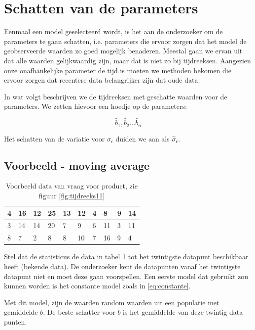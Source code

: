 \section{Schatten van de parameters}
Eenmaal een model geselecteerd wordt, is het aan de onderzoeker om de parameters te gaan schatten, i.e. parameters die ervoor zorgen dat het model de geobserveerde waarden zo goed mogelijk benaderen. Meestal gaan we ervan uit dat alle waarden gelijkwaardig zijn, maar dat is niet zo bij tijdreeksen. Aangezien onze onafhankelijke parameter de tijd is moeten we methoden bekomen die ervoor zorgen dat recentere data belangrijker zijn dat oude data. 

In wat volgt beschrijven we de tijdreeksen met geschatte waarden voor de parameters. We zetten hievoor een hoedje op de parameters:

\[ \widehat{b}_{1}, \widehat{b}_{2} \dots \widehat{b}_{n} \] 

Het schatten van de variatie voor $\sigma_{\epsilon}$ duiden we aan als $\widehat{\sigma}_{\epsilon}$.

\subsection{Voorbeeld - moving average}

\begin{table}[t]
\centering
    \begin{tabular}{|l|l|l|l|l|l|l|l|l|l|}
    \hline
    4 & 16 & 12 & 25 & 13 & 12 & 4 & 8  & 9 & 14 \\ \hline
    3 & 14 & 14 & 20 & 7  & 9  & 6 & 11 & 3 & 11 \\ \hline
    8 & 7  & 2  & 8  & 8  & 10 & 7 & 16 & 9 & 4  \\ \hline
    \end{tabular}
    \caption{Voorbeeld data van vraag voor product, zie figuur \ref{fig:tijdreeks11}}
    \label{tab:data}
\end{table}

Stel dat de statisticus de data in tabel \ref{tab:data} tot het twintigste datapunt beschikbaar heeft (bekende data). De onderzoeker kent de datapunten vanaf het twintigste datapunt niet en moet deze gaan voorspellen. Een eerste model dat gebruikt zou kunnen worden is het constante model zoals in \ref{eq:constante}. 

Met dit model, zijn de waarden random waarden uit een populatie met gemiddelde $b$. De beste schatter voor $b$ is het gemiddelde van deze twintig data punten. 

